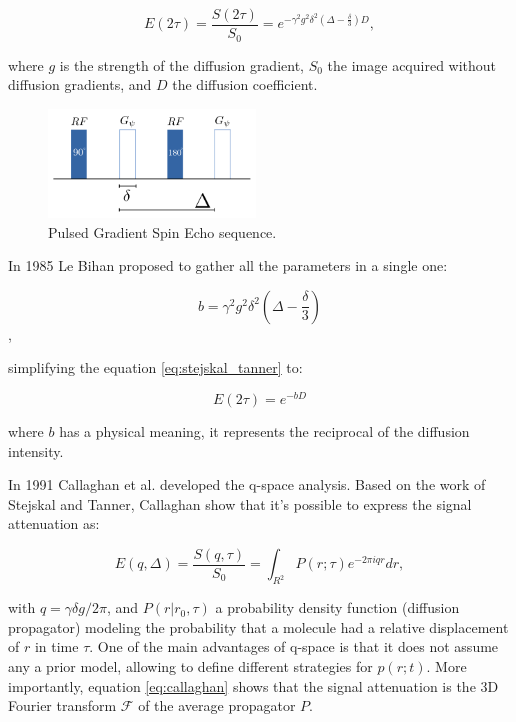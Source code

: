 \begin{equation}
    E(2\tau) = 
    \frac{S(2\tau)}{S_0} =
    e^{-\gamma^2 g^2 \delta^2 \left(\Delta - \frac{\delta}{3}\right) D},
\label{eq:stejskal_tanner}
\end{equation}

where $g$ is the strength of the diffusion gradient, $S_0$ the
image acquired without diffusion gradients, and $D$ the diffusion coefficient.

\begin{figure}
    \includegraphics[width=0.49\textwidth]{3.mri/img/fgp.png}
    \caption{Pulsed Gradient Spin Echo sequence.}
    \label{fig:fgp}
\end{figure}  

In 1985 Le Bihan \cite{LEBIHAN} proposed to gather all the parameters in a
single one: 

$$ b = \gamma^2 g^2 \delta^2 \left(\Delta - \frac{\delta}{3}\right) $$ ,

simplifying the equation \ref{eq:stejskal_tanner} to:

$$ E(2\tau) = e^{-b D} $$

where $b$ has a physical meaning, it represents the reciprocal of the diffusion
intensity\cite{LEBIHAN}.

In 1991 Callaghan et al. \cite{Callaghan1991} developed the q-space analysis.
Based on the work of Stejskal and Tanner, Callaghan show that it's possible
to express the signal attenuation as:

\begin{equation}
\label{eq:callaghan}
E(q,\Delta) =  \frac{S(q,\tau)}{S_0} = \int_{R^2}{P(r;\tau)e^{-2\pi i q r} dr},
\end{equation}

with $q =  \gamma \delta g / 2\pi$, and $P(r|r_0, \tau)$ a probability density
function (diffusion propagator) modeling the probability that a molecule had a
relative displacement of $r$ in time $\tau$. One of the main advantages of
q-space is that it does not assume any a prior model, allowing to define 
different strategies for $p(r;t)$. More importantly, equation
\ref{eq:callaghan} shows that the signal attenuation is the 3D Fourier
transform $\mathcal{F}$ of the average propagator $P$. 

